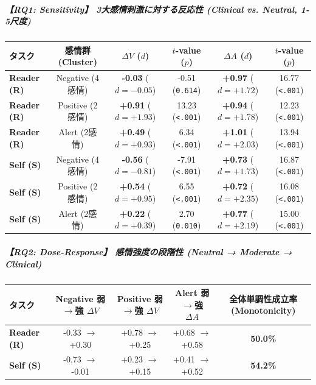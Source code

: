 \subparagraph{【RQ1: Sensitivity】 3大感情刺激に対する反応性 (Clinical vs. Neutral, 1-5尺度)}
\begin{center}
\small
\begin{tabular}{lccccc}
\toprule
\textbf{タスク} & \textbf{感情群 (Cluster)} & \textbf{$\Delta V$ ($d$)} & \textbf{$t$-value ($p$)} & \textbf{$\Delta A$ ($d$)} & \textbf{$t$-value ($p$)} \\
\midrule
\textbf{Reader (R)} & Negative (4感情) & \textbf{-0.03} ($d=-0.05$) & -0.51 (\texttt{0.614}) & \textbf{+0.97} ($d=+1.72$) & 16.77 (\texttt{<.001}) \\
\textbf{Reader (R)} & Positive (2感情) & \textbf{+0.91} ($d=+1.93$) & 13.23 (\texttt{<.001}) & \textbf{+0.94} ($d=+1.78$) & 12.23 (\texttt{<.001}) \\
\textbf{Reader (R)} & Alert (2感情) & \textbf{+0.49} ($d=+0.93$) & 6.34 (\texttt{<.001}) & \textbf{+1.01} ($d=+2.03$) & 13.94 (\texttt{<.001}) \\
\textbf{Self (S)} & Negative (4感情) & \textbf{-0.56} ($d=-0.81$) & -7.91 (\texttt{<.001}) & \textbf{+0.73} ($d=+1.73$) & 16.87 (\texttt{<.001}) \\
\textbf{Self (S)} & Positive (2感情) & \textbf{+0.54} ($d=+0.95$) & 6.55 (\texttt{<.001}) & \textbf{+0.72} ($d=+2.35$) & 16.08 (\texttt{<.001}) \\
\textbf{Self (S)} & Alert (2感情) & \textbf{+0.22} ($d=+0.39$) & 2.70 (\texttt{0.010}) & \textbf{+0.77} ($d=+2.19$) & 15.00 (\texttt{<.001}) \\
\bottomrule
\end{tabular}
\end{center}


\subparagraph{【RQ2: Dose-Response】 感情強度の段階性 (Neutral → Moderate → Clinical)}
\begin{center}
\small
\begin{tabular}{lcccc}
\toprule
\textbf{タスク} & \textbf{Negative 弱$\rightarrow$強 $\Delta V$} & \textbf{Positive 弱$\rightarrow$強 $\Delta V$} & \textbf{Alert 弱$\rightarrow$強 $\Delta A$} & \textbf{全体単調性成立率 (Monotonicity)} \\
\midrule
\textbf{Reader (R)} & -0.33 $\rightarrow$ +0.30 & +0.78 $\rightarrow$ +0.25 & +0.68 $\rightarrow$ +0.58 & \textbf{50.0\%} \\
\textbf{Self (S)} & -0.73 $\rightarrow$ -0.01 & +0.23 $\rightarrow$ +0.15 & +0.41 $\rightarrow$ +0.52 & \textbf{54.2\%} \\
\bottomrule
\end{tabular}
\end{center}


